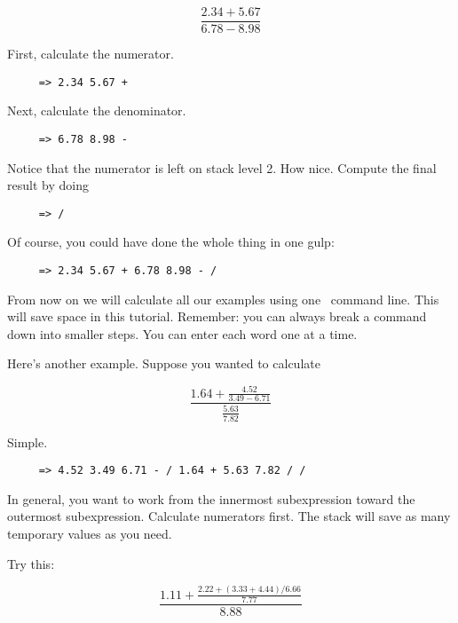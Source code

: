 \begin{displaymath}
     \frac{ 2.34 + 5.67 }{ 6.78 - 8.98 }
\end{displaymath}

First, calculate the numerator.

\begin{verbatim}
     => 2.34 5.67 +
\end{verbatim}

Next, calculate the denominator.

\begin{verbatim}
     => 6.78 8.98 -
\end{verbatim}

Notice that the numerator is left on stack level 2. How nice. Compute the final result by doing

\begin{verbatim}
     => /
\end{verbatim}

Of course, you could have done the whole thing in one gulp:

\begin{verbatim}
     => 2.34 5.67 + 6.78 8.98 - /
\end{verbatim}

From now on we will calculate all our examples using one \CLAC\ command line. This will save
space in this tutorial. Remember: you can always break a command down into smaller steps. You
can enter each word one at a time.

Here's another example. Suppose you wanted to calculate

\begin{displaymath}
     \frac { 1.64 + \frac {4.52}{3.49 - 6.71} }{ \frac {5.63}{7.82} }
\end{displaymath}

Simple.

\begin{verbatim}
     => 4.52 3.49 6.71 - / 1.64 + 5.63 7.82 / /
\end{verbatim}

In general, you want to work from the innermost subexpression toward the outermost
subexpression. Calculate numerators first. The stack will save as many temporary values as you
need.

Try this:

\begin{displaymath}
     \frac{1.11 + \frac{2.22 + (3.33 + 4.44)/6.66 }{7.77} }{8.88}
\end{displaymath}

